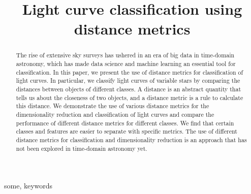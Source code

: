 \documentclass[conference]{IEEEtran}
\title{\LARGE \bf
Light curve classification using distance metrics
}
\begin{document}

\author{
}

\maketitle

\begin{abstract}
The rise of extensive sky surveys has ushered in an era of big data in time-domain astronomy, which has made data science and machine learning an essential tool for classification. In this paper, we present the use of distance metrics for classification of light curves. In particular, we classify light curves of variable stars by comparing the distances between objects of different classes.
A distance is an abstract quantity that tells us about the closeness of two objects, and a distance metric is a rule to calculate this distance. We demonstrate the use of various distance metrics for the dimensionality reduction and classification of light curves and compare the performance of different distance metrics for different classes.
We find that certain classes and features are easier to separate with specific metrics. The use of different distance metrics for classification and dimensionality reduction is an approach that has not been explored in time-domain astronomy yet.
\end{abstract}

\begin{IEEEkeywords}
some, keywords
\end{IEEEkeywords}
\end{document}

